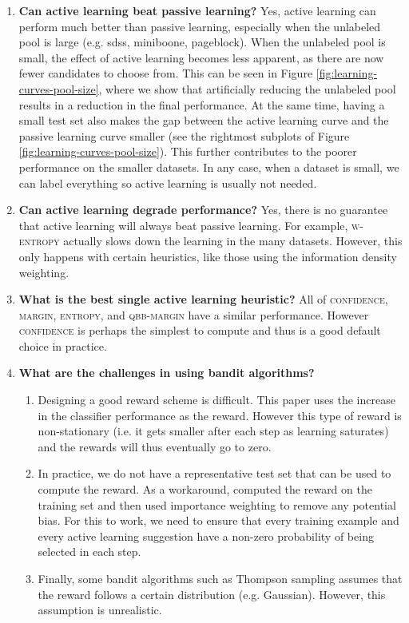 \documentclass[fleqn,10pt,lineno]{wlpeerj} %
\begin{document}
\begin{enumerate}
	\item \textbf{Can active learning beat passive learning?} Yes, active
	learning can perform much better than passive learning, especially when the
	unlabeled pool is large (e.g. sdss, miniboone, pageblock). When the
	unlabeled pool is small, the effect of active learning becomes less
	apparent, as there are now fewer candidates to choose from. This can be
	seen in Figure \ref{fig:learning-curves-pool-size}, where we show that
	artificially reducing the unlabeled pool results in a reduction in the
	final performance. At the same time, having a small test set also makes the
	gap between the active learning curve and the passive learning curve
	smaller (see the rightmost subplots of Figure
	\ref{fig:learning-curves-pool-size}). This further contributes to the
	poorer performance on the smaller datasets. In any case, when a dataset is
	small, we can label everything so active learning is usually not needed.

	\item \textbf{Can active learning degrade performance?} Yes, there is no
	guarantee that active learning will always beat passive learning. For
	example, \textsc{w-entropy} actually slows down the learning in the many
	datasets. However, this only happens with certain heuristics, like those
	using the information density weighting.

	\item \textbf{What is the best single active learning heuristic?} All of
	\textsc{confidence}, \textsc{margin}, \textsc{entropy}, and
	\textsc{qbb-margin} have a similar performance. However \textsc{confidence}
	is perhaps the simplest to compute and thus is a good default choice in
	practice.

	\item \textbf{What are the challenges in using bandit algorithms?}
	\begin{enumerate}
		\item Designing a good reward scheme is difficult. This paper uses the
		increase in the classifier performance as the reward. However this type
		of reward is non-stationary (i.e. it gets smaller after each step as
		learning saturates) and the rewards will thus eventually go to zero.
		\item In practice, we do not have a representative test set that can be
		used to compute the reward. As a workaround, \cite{hsu15} computed the
		reward on the training set and then used importance weighting to remove
		any potential bias. For this to work, we need to ensure that every
		training example and every active learning suggestion have a non-zero
		probability of being selected in each step.
		\item Finally, some bandit algorithms such as Thompson sampling
		assumes that the reward follows a certain distribution (e.g. Gaussian).
		However, this assumption is unrealistic.
	\end{enumerate}


\end{enumerate}
\end{document}
